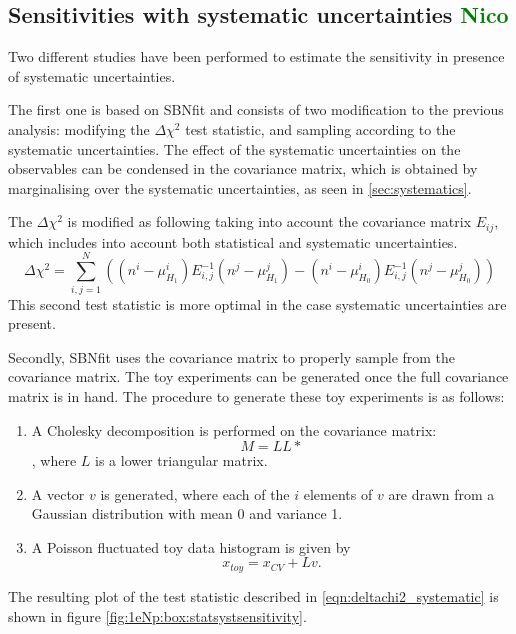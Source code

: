 \documentclass[a4paper]{article}
\begin{document}
\subsection{Sensitivities with systematic uncertainties \textcolor{green}{Nico}}
\label{subsec:sensitivity_syst_uncertainty}
Two different studies have been performed to estimate the sensitivity in presence of systematic uncertainties.

The first one is based on SBNfit and consists of two modification to the previous analysis: modifying the $\Delta \chi^2$ test statistic, and sampling according to the systematic uncertainties.
The effect of the systematic uncertainties on the observables can be condensed in the covariance matrix, which is obtained by marginalising over the systematic uncertainties, as seen in \ref{sec:systematics}.

The $\Delta \chi^2$ is modified as following taking into account the covariance matrix $E_{ij}$, which includes into account both statistical and systematic uncertainties.
\begin{equation}
\label{eqn:deltachi2_systematic}
\Delta\chi^2 = \sum_{i,j=1}^{N}\left( (n^i - \mu^i_{H_1})E_{i,j}^{-1}(n^j - \mu^j_{H_1}) - (n^i - \mu^i_{H_0})E_{i,j}^{-1}(n^j - \mu^j_{H_0})\right)
\end{equation}
This second test statistic is more optimal in the case systematic uncertainties are present.

Secondly, SBNfit uses the covariance matrix to properly sample from the covariance matrix.
The toy experiments can be generated once the full covariance matrix is in hand. The procedure to generate these toy experiments is as follows:
\begin{enumerate}
    \item A Cholesky decomposition is performed on the covariance matrix: $$M = LL*$$,
    where $L$ is a lower triangular matrix.
    \item A vector $v$ is generated, where each of the $i$ elements of $v$ are drawn from a Gaussian distribution with mean 0 and variance 1.
    \item A Poisson fluctuated toy data histogram is given by
$$x_{toy} = x_{CV} + Lv.$$
\end{enumerate}

The resulting plot of the test statistic described in \ref{eqn:deltachi2_systematic} is shown in figure \ref{fig:1eNp:box:statsystsensitivity}.
\end{document}
